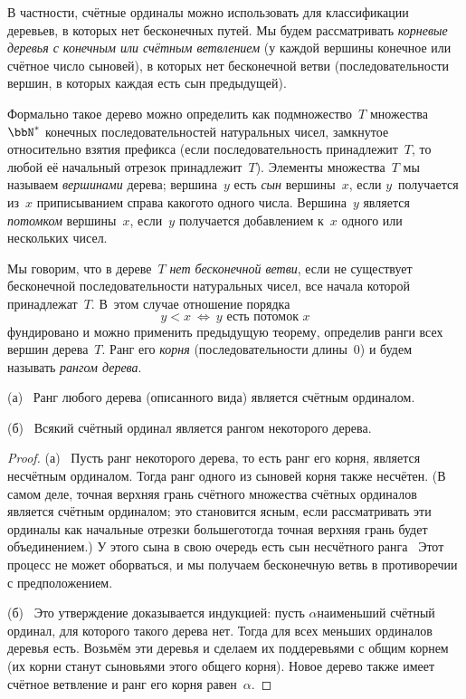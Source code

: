 В частности, счётные ординалы можно использовать для
классификации деревьев, в которых нет бесконечных путей. Мы
будем рассматривать
\emph{корневые деревья с конечным или счётным ветвлением}
(у
каждой вершины конечное или счётное число сыновей), в которых
нет бесконечной ветви (последовательности вершин, в которых
каждая есть сын предыдущей).

Формально такое дерево можно определить как подмножество~$T$
множества~$\bbN^*$\index{$\bbN^*$} конечных последовательностей натуральных
чисел, замкнутое относительно взятия префикса (если
последовательность принадлежит~$T$, то любой её начальный
отрезок принадлежит~$T$). Элементы множества~$T$ мы называем
\emph{вершинами} дерева; вершина~$y$ есть
\emph{сын} вершины~$x$, если
$y$~получается из~$x$ приписыванием справа какого\д то одного
числа. Вершина~$y$ является \emph{потомком} вершины~$x$,
если~$y$ получается добавлением к~$x$ одного или нескольких
чисел.

Мы говорим, что в дереве~$T$ \emph{нет бесконечной ветви},
если
не существует бесконечной последовательности натуральных чисел,
все начала которой принадлежат~$T$. В~этом случае отношение
порядка
        $$
y<x \ \Leftrightarrow \ \text{$y$ есть потомок~$x$}
        $$
фундировано и можно применить предыдущую теорему, определив
ранги всех вершин дерева~$T$. Ранг его \emph{корня}
(последовательности длины~$0$) и будем называть \emph{рангом
дерева}.

\begin{theorem}
        \label{countable-ordinals}%
(\textsf{а})~%
Ранг любого дерева (описанного вида) является счётным ординалом.

(\textsf{б})~%
Всякий счётный ординал является рангом некоторого дерева.
\end{theorem}

\begin{proof}
(а)~%
Пусть ранг некоторого дерева, то есть ранг его корня, является
несчётным ординалом. Тогда ранг одного из сыновей корня также
несчётен. (В самом деле, точная верхняя грань счётного множества
счётных ординалов является счётным ординалом; это становится
ясным, если рассматривать эти ординалы как начальные отрезки
большего\т тогда точная верхняя грань будет объединением.)
У этого сына в свою очередь есть сын несчётного ранга~
Этот процесс не может оборваться, и мы получаем бесконечную
ветвь в противоречии с предположением.

(б)~%
Это утверждение доказывается индукцией: пусть $\alpha$\т наименьший
счётный ординал, для которого такого дерева нет. Тогда для
всех меньших ординалов деревья
есть. Возьмём эти деревья
и сделаем их поддеревьями с общим корнем (их корни станут
сыновьями этого общего корня). Новое дерево также имеет
счётное ветвление и ранг его корня равен~$\alpha$.
\end{proof}

